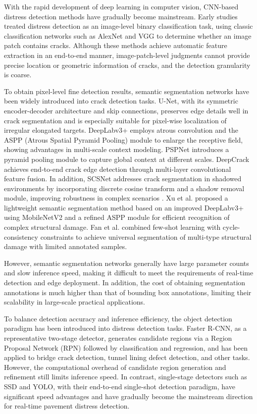 \documentclass[twocolumn]{sn-jnl}
\begin{document}
	With the rapid development of deep learning in computer vision, CNN-based distress detection methods have gradually become mainstream. Early studies treated distress detection as an image-level binary classification task, using classic classification networks such as AlexNet and VGG to determine whether an image patch contains cracks. Although these methods achieve automatic feature extraction in an end-to-end manner, image-patch-level judgments cannot provide precise location or geometric information of cracks, and the detection granularity is coarse.
	
	To obtain pixel-level fine detection results, semantic segmentation networks have been widely introduced into crack detection tasks. U-Net, with its symmetric encoder-decoder architecture and skip connections, preserves edge details well in crack segmentation and is especially suitable for pixel-wise localization of irregular elongated targets. DeepLabv3+ employs atrous convolution and the ASPP (Atrous Spatial Pyramid Pooling) module to enlarge the receptive field, showing advantages in multi-scale context modeling. PSPNet introduces a pyramid pooling module to capture global context at different scales. DeepCrack achieves end-to-end crack edge detection through multi-layer convolutional feature fusion. In addition, SCSNet addresses crack segmentation in shadowed environments by incorporating discrete cosine transform and a shadow removal module, improving robustness in complex scenarios \cite{Zhang2024}. Xu et al. \cite{Xu2023} proposed a lightweight semantic segmentation method based on an improved DeepLabv3+ using MobileNetV2 and a refined ASPP module for efficient recognition of complex structural damage. Fan et al. \cite{Fan2024} combined few-shot learning with cycle-consistency constraints to achieve universal segmentation of multi-type structural damage with limited annotated samples.
	
	However, semantic segmentation networks generally have large parameter counts and slow inference speed, making it difficult to meet the requirements of real-time detection and edge deployment. In addition, the cost of obtaining segmentation annotations is much higher than that of bounding box annotations, limiting their scalability in large-scale practical applications.
	
	To balance detection accuracy and inference efficiency, the object detection paradigm has been introduced into distress detection tasks. Faster R-CNN, as a representative two-stage detector, generates candidate regions via a Region Proposal Network (RPN) followed by classification and regression, and has been applied to bridge crack detection, tunnel lining defect detection, and other tasks. However, the computational overhead of candidate region generation and refinement still limits inference speed. In contrast, single-stage detectors such as SSD and YOLO, with their end-to-end single-shot detection paradigm, have significant speed advantages and have gradually become the mainstream direction for real-time pavement distress detection.
	
\end{document}
